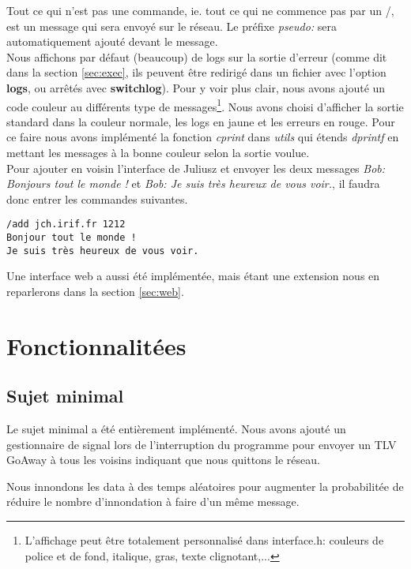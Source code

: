 \documentclass[a4paper,10pt]{article} %
\begin{document}
Tout ce qui n'est pas une commande, ie. tout ce qui ne commence pas par un \textrm{/}, est un message qui sera envoyé sur le réseau. Le préfixe \textit{pseudo: } sera automatiquement ajouté devant le message.\\

Nous affichons par défaut (beaucoup) de logs sur la sortie d'erreur (comme dit dans la section \ref{sec:exec}, ils peuvent être redirigé dans un fichier avec l'option \textbf{logs}, ou arrêtés avec \textbf{switchlog}). Pour y voir plus clair, nous avons ajouté un code couleur au différents type de messages\footnote{L'affichage peut être totalement personnalisé dans \textrm{interface.h}: couleurs de police et de fond, italique, gras, texte clignotant,...}. Nous avons choisi d'afficher la sortie standard dans la couleur normale, les logs en jaune et les erreurs en rouge. Pour ce faire nous avons implémenté la fonction \textit{cprint} dans \textit{utils} qui étends \textit{dprintf} en mettant les messages à la bonne couleur selon la sortie voulue.\\

Pour ajouter en voisin l'interface de Juliusz et envoyer les deux messages \textit{Bob: Bonjours tout le monde !} et \textit{Bob: Je suis très heureux de vous voir.}, il faudra donc entrer les commandes suivantes.

\begin{verbatim}
/add jch.irif.fr 1212
Bonjour tout le monde !
Je suis très heureux de vous voir.
\end{verbatim}

Une interface web a aussi été implémentée, mais étant une extension nous en reparlerons dans la section \ref{sec:web}.

\section{Fonctionnalitées}

\subsection{Sujet minimal}
Le sujet minimal a été entièrement implémenté.
Nous avons ajouté un gestionnaire de signal lors de l'interruption du programme pour envoyer un TLV GoAway à tous les voisins indiquant que nous quittons le réseau.

Nous innondons les data à des temps aléatoires pour augmenter la probabilitée de réduire le nombre d'innondation à faire d'un même message.
\end{document}

